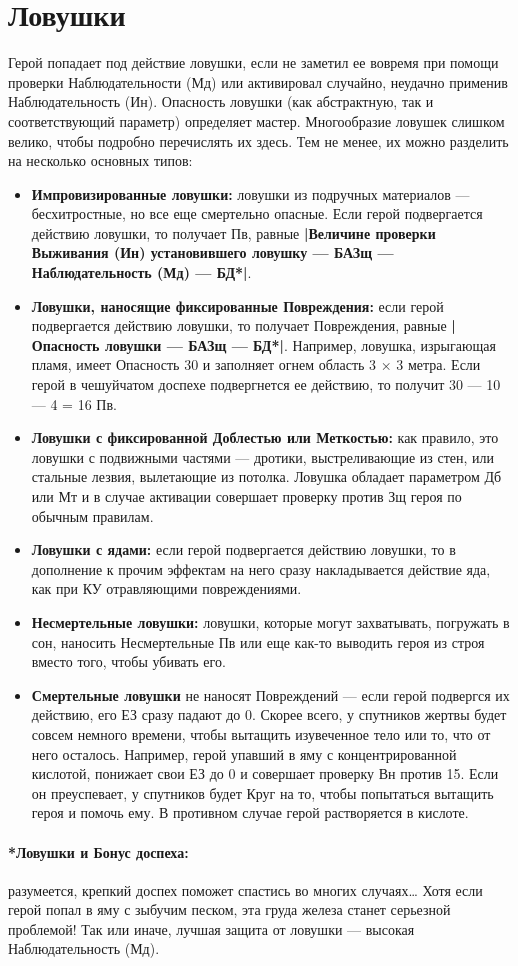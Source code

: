 \section{Ловушки}
Герой попадает под действие ловушки, если не заметил ее вовремя при помощи проверки Наблюдательности (Мд) или активировал случайно, неудачно применив Наблюдательность (Ин). Опасность ловушки (как абстрактную, так и соответствующий параметр) определяет мастер. Многообразие ловушек слишком велико, чтобы подробно перечислять их здесь. Тем не менее, их можно разделить на несколько основных типов:
\begin{itemize}
\item \textbf{Импровизированные ловушки:} ловушки из подручных материалов — бесхитростные, но все еще смертельно опасные. Если герой подвергается действию ловушки, то получает Пв, равные \textbf{|Величине проверки Выживания (Ин) установившего ловушку — БАЗщ — Наблюдательность (Мд) — БД*|}.
\item \textbf{Ловушки, наносящие фиксированные Повреждения:} если герой подвергается действию ловушки, то получает Повреждения, равные \textbf{|Опасность ловушки — БАЗщ — БД*|}. Например, ловушка, изрыгающая пламя, имеет Опасность 30 и заполняет огнем область 3 × 3 метра. Если герой в чешуйчатом доспехе подвергнется ее действию, то получит 30 — 10 — 4 = 16 Пв.
\item \textbf{Ловушки с фиксированной Доблестью или Меткостью:} как правило, это ловушки с подвижными частями — дротики, выстреливающие из стен, или стальные лезвия, вылетающие из потолка. Ловушка обладает параметром Дб или Мт и в случае активации совершает проверку против Зщ героя по обычным правилам.
\item \textbf{Ловушки с ядами:} если герой подвергается действию ловушки, то в дополнение к прочим эффектам на него сразу накладывается действие яда, как при КУ отравляющими повреждениями.
\item \textbf{Несмертельные ловушки:} ловушки, которые могут захватывать, погружать в сон, наносить Несмертельные Пв или еще как-то выводить героя из строя вместо того, чтобы убивать его.
\item \textbf{Смертельные ловушки} не наносят Повреждений — если герой подвергся их действию, его ЕЗ сразу падают до 0. Скорее всего, у спутников жертвы будет совсем немного времени, чтобы вытащить изувеченное тело или то, что от него осталось. Например, герой упавший в яму с концентрированной кислотой, понижает свои ЕЗ до 0 и совершает проверку Вн против 15. Если он преуспевает, у спутников будет Круг на то, чтобы попытаться вытащить героя и помочь ему. В противном случае герой растворяется в кислоте.
\end{itemize}
\paragraph{*Ловушки и Бонус доспеха:} разумеется, крепкий доспех поможет спастись во многих случаях… Хотя если герой попал в яму с зыбучим песком, эта груда железа станет серьезной проблемой! Так или иначе, лучшая защита от ловушки — высокая Наблюдательность (Мд).